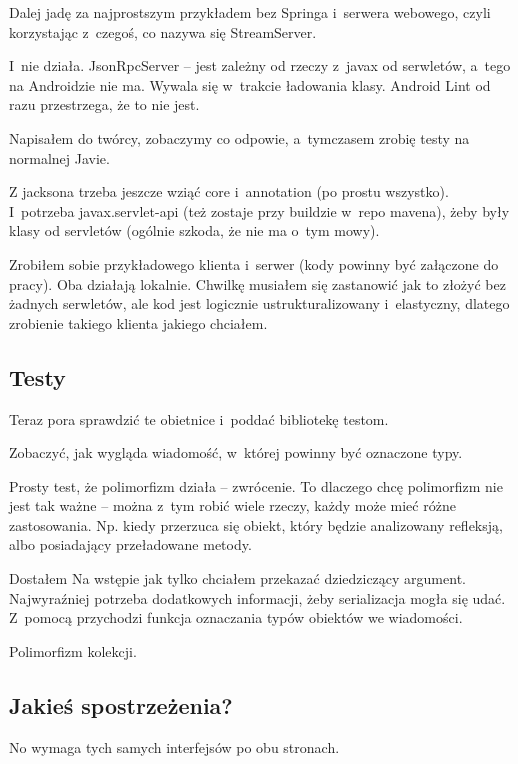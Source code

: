 Dalej jadę za najprostszym przykładem bez Springa i~serwera webowego, czyli korzystając z~czegoś, co nazywa się StreamServer.

I~nie działa. JsonRpcServer -- jest zależny od rzeczy z~javax od serwletów, a~tego na Androidzie nie ma. Wywala się w~trakcie ładowania klasy. Android Lint od razu przestrzega, że to nie jest.

Napisałem do twórcy, zobaczymy co odpowie, a~tymczasem zrobię testy na normalnej Javie.

Z jacksona trzeba jeszcze wziąć core i~annotation (po prostu wszystko). I~potrzeba javax.servlet-api (też zostaje przy buildzie w~repo mavena), żeby były klasy od servletów (ogólnie szkoda, że nie ma o~tym mowy).

Zrobiłem sobie przykładowego klienta i~serwer (kody powinny być załączone do pracy). Oba działają lokalnie. Chwilkę musiałem się zastanowić jak to złożyć bez żadnych serwletów, ale kod jest logicznie ustrukturalizowany i~elastyczny, dlatego zrobienie takiego klienta jakiego chciałem.

\subsection{Testy}
Teraz pora sprawdzić te obietnice i~poddać bibliotekę testom.

Zobaczyć, jak wygląda wiadomość, w~której powinny być oznaczone typy.

Prosty test, że polimorfizm działa -- zwrócenie. To dlaczego chcę polimorfizm nie jest tak ważne -- można z~tym robić wiele rzeczy, każdy może mieć różne zastosowania. Np. kiedy przerzuca się obiekt, który będzie analizowany refleksją, albo posiadający przeładowane metody.

Dostałem
Na wstępie jak tylko chciałem przekazać dziedziczący argument.
Najwyraźniej potrzeba dodatkowych informacji, żeby serializacja mogła się udać. Z~pomocą przychodzi funkcja oznaczania typów obiektów we wiadomości\cite{jackson-polymorphic}.


Polimorfizm kolekcji.


\subsection{Jakieś spostrzeżenia?}
No wymaga tych samych interfejsów po obu stronach.

